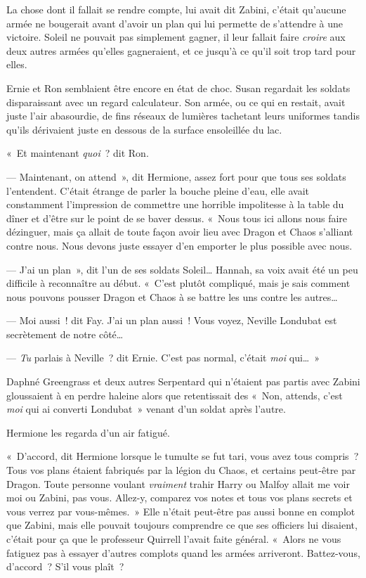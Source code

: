 La chose dont il fallait se rendre compte, lui avait dit Zabini, c'était qu'aucune armée ne bougerait avant d'avoir un plan qui lui permette de s'attendre à une victoire. Soleil ne pouvait pas simplement gagner, il leur fallait faire \emph{croire} aux deux autres armées qu'elles gagneraient, et ce jusqu'à ce qu'il soit trop tard pour elles.

Ernie et Ron semblaient être encore en état de choc. Susan regardait les soldats disparaissant avec un regard calculateur. Son armée, ou ce qui en restait, avait juste l'air abasourdie, de fins réseaux de lumières tachetant leurs uniformes tandis qu'ils dérivaient juste en dessous de la surface ensoleillée du lac.

«~Et maintenant \emph{quoi}~? dit Ron.

--- Maintenant, on attend~», dit Hermione, assez fort pour que tous ses soldats l'entendent. C'était étrange de parler la bouche pleine d'eau, elle avait constamment l'impression de commettre une horrible impolitesse à la table du dîner et d'être sur le point de se baver dessus. «~Nous tous ici allons nous faire dézinguer, mais ça allait de toute façon avoir lieu avec Dragon et Chaos s'alliant contre nous. Nous devons juste essayer d'en emporter le plus possible avec nous.

--- J'ai un plan~», dit l'un de ses soldats Soleil… Hannah, sa voix avait été un peu difficile à reconnaître au début. «~C'est plutôt compliqué, mais je sais comment nous pouvons pousser Dragon et Chaos à se battre les uns contre les autres…

--- Moi aussi~! dit Fay. J'ai un plan aussi~! Vous voyez, Neville Londubat est secrètement de notre côté…

--- \emph{Tu} parlais à Neville~? dit Ernie. C'est pas normal, c'était \emph{moi} qui…~»

Daphné Greengrass et deux autres Serpentard qui n'étaient pas partis avec Zabini gloussaient à en perdre haleine alors que retentissait des «~Non, attends, c'est \emph{moi} qui ai converti Londubat~» venant d'un soldat après l'autre.

Hermione les regarda d'un air fatigué.

«~D'accord, dit Hermione lorsque le tumulte se fut tari, vous avez tous compris~? Tous vos plans étaient fabriqués par la légion du Chaos, et certains peut-être par Dragon. Toute personne voulant \emph{vraiment} trahir Harry ou Malfoy allait me voir moi ou Zabini, pas vous. Allez-y, comparez vos notes et tous vos plans secrets et vous verrez par vous-mêmes.~» Elle n'était peut-être pas aussi bonne en complot que Zabini, mais elle pouvait toujours comprendre ce que ses officiers lui disaient, c'était pour ça que le professeur Quirrell l'avait faite général. «~Alors ne vous fatiguez pas à essayer d'autres complots quand les armées arriveront. Battez-vous, d'accord~? S'il vous plaît~?

